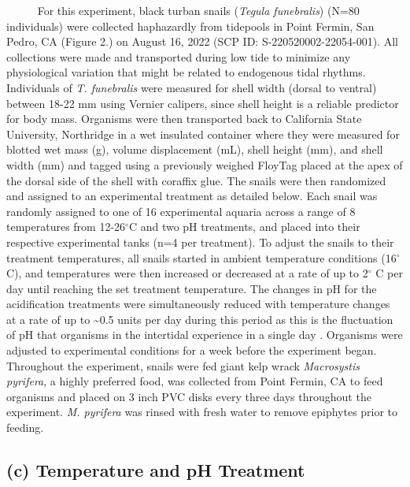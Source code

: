 \documentclass[
  12pt,
]{article}
\begin{document}
~~~~~ For this experiment, black turban snails
(\emph{Tegula funebralis}) (N=80 individuals) were collected haphazardly
from tidepools in Point Fermin, San Pedro, CA (Figure 2.) on August 16,
2022 (SCP ID: S-220520002-22054-001). All collections were made and
transported during low tide to minimize any physiological variation that
might be related to endogenous tidal rhythms. Individuals of
\emph{T. funebralis} were measured for shell width (dorsal to ventral)
between 18-22 mm using Vernier calipers, since shell height is a
reliable predictor for body mass. Organisms were then transported back
to California State University, Northridge in a wet insulated container
where they were measured for blotted wet mass (g), volume displacement
(mL), shell height (mm), and shell width (mm) and tagged using a
previously weighed FloyTag placed at the apex of the dorsal side of the
shell with coraffix glue. The snails were then randomized and assigned
to an experimental treatment as detailed below. Each snail was randomly
assigned to one of 16 experimental aquaria across a range of 8
temperatures from 12-26\(^\circ\)C and two pH treatments, and placed
into their respective experimental tanks (n=4 per treatment). To adjust
the snails to their treatment temperatures, all snails started in
ambient temperature conditions (16\(^\circ\)C), and temperatures were
then increased or decreased at a rate of up to 2\(^\circ\) C per day
until reaching the set treatment temperature. The changes in pH for the
acidification treatments were simultaneously reduced with temperature
changes at a rate of up to \textasciitilde0.5 units per day during this
period as this is the fluctuation of pH that organisms in the intertidal
experience in a single day \citep{jellison2016ocean}. Organisms were
adjusted to experimental conditions for a week before the experiment
began. Throughout the experiment, snails were fed giant kelp wrack
\emph{Macrosystis pyrifera}, a highly preferred food, was collected from
Point Fermin, CA to feed organisms and placed on 3 inch PVC disks every
three days throughout the experiment. \emph{M. pyrifera} was rinsed with
fresh water to remove epiphytes prior to feeding.

\hypertarget{c-temperature-and-ph-treatment}{%
\subsection{(c) Temperature and pH
Treatment}\label{c-temperature-and-ph-treatment}}
\end{document}
